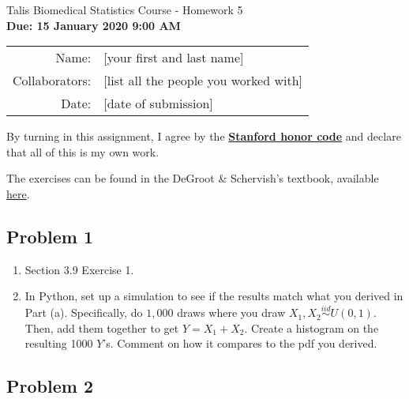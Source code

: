 \documentclass[12pt]{article}\usepackage[]{graphicx}\usepackage[]{color}
\begin{document}
\begin{center}
{\Large Talis Biomedical Statistics Course - Homework 5} \\
{\small \textbf{Due: 15 January 2020 9:00 AM}}
\newline

\begin{tabular}{rl}
  Name: & [your first and last name] \\
  Collaborators: & [list all the people you worked with] \\
  Date: & [date of submission]
\end{tabular}
\end{center}

By turning in this assignment, I agree by the \textbf{\href{https://communitystandards.stanford.edu/policies-and-guidance/honor-code}{Stanford honor code}} and declare
that all of this is my own work. \\

\vspace{.2in}

The exercises can be found in the DeGroot \& Schervish's textbook, available
\textcolor{blue}{\href{http://professor.ufabc.edu.br/~nelson.faustino/Ensino/IPE2016/Livros/Morris\%20H\%20DeGroot_\%20Mark\%20J\%20Schervish-Probability\%20and\%20statistics-Pearson\%20Education\%20\%20(2012)\%20(1).pdf}{here}}.


\subsection*{Problem 1}

\begin{enumerate}[label=(\alph*)]
  \item Section 3.9 Exercise 1.

  \item In Python, set up a simulation to see if the results match what you
  derived in Part (a). Specifically, do $1,000$ draws where you draw
  $X_1, X_2 \overset{iid}{\sim} U(0, 1)$. Then, add them together to get $Y = X_1 + X_2$. Create a histogram on the resulting 1000 $Y$'s. Comment on how it compares
  to the pdf you derived.

\end{enumerate}


\subsection*{Problem 2}
\end{document}
